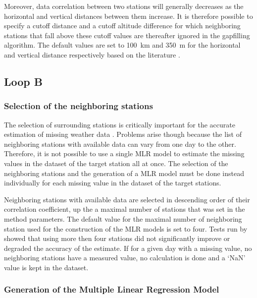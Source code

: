 \documentclass[TechnicalNoteMeteo.tex]{subfiles}
\begin{document}
Moreover, data correlation between two stations will generally decreases as the horizontal and vertical distances between them increase. It is therefore possible to specify a cutoff distance and a cutoff altitude difference for which neighboring stations that fall above these cutoff values are thereafter ignored in the gapfilling algorithm. The default values are set to \SI{100}{km} and \SI{350}{m} for the horizontal and vertical distance respectively based on the literature \cite{tronci_comparison_1986,xia_forest_1999,simolo_improving_2010}.

\subsection{Loop B}

\subsubsection{Selection of the neighboring stations}\label{sec:select_stations}

The selection of surrounding stations is critically important for the accurate estimation of missing weather data \cite{eischeid_creating_2000}. Problems arise though because the list of neighboring stations with available data can vary from one day to the other. Therefore, it is not possible to use a single MLR model to estimate the missing values in the dataset of the target station all at once. The selection of the neighboring stations and the generation of a MLR model must be done instead individually for each missing value in the dataset of the target stations.

Neighboring stations with available data are selected in descending order of their correlation coefficient, up the a maximal number of stations that was set in the method parameters. The default value for the maximal number of neighboring station used for the construction of the MLR models is set to four. Tests run by \cite{eischeid_creating_2000} showed that using more then four stations did not significantly improve or degraded the accuracy of the estimate. If for a given day with a missing value, no neighboring stations have a measured value, no calculation is done and a ‘NaN' value is kept in the dataset. 

\subsubsection{Generation of the Multiple Linear Regression Model}
\end{document}
